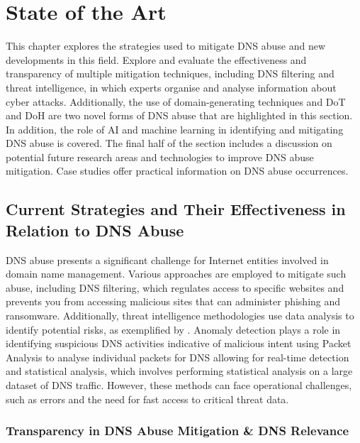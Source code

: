 \chapter{State of the Art}

This chapter explores the strategies used to mitigate DNS abuse and new developments in this field. Explore and evaluate the effectiveness and transparency of multiple mitigation techniques, including DNS filtering and threat intelligence, in which experts organise and analyse information about cyber attacks. Additionally, the use of domain-generating techniques and DoT and DoH are two novel forms of DNS abuse that are highlighted in this section. In addition, the role of AI and machine learning in identifying and mitigating DNS abuse is covered. The final half of the section includes a discussion on potential future research areas and technologies to improve DNS abuse mitigation. Case studies offer practical information on DNS abuse occurrences. 


\section{Current Strategies and Their Effectiveness in Relation to DNS Abuse}


DNS abuse presents a significant challenge for Internet entities involved in domain name management. Various approaches are employed to mitigate such abuse, including DNS filtering, which regulates access to specific websites and prevents you from accessing malicious sites that can administer phishing and ransomware. Additionally, threat intelligence methodologies use data analysis to identify potential risks, as exemplified by \cite{schmid2021thirty}. Anomaly detection plays a role in identifying suspicious DNS activities indicative of malicious intent using Packet Analysis to analyse individual packets for DNS allowing for real-time detection and statistical analysis, which involves performing statistical analysis on a large dataset of DNS traffic. However, these methods can face operational challenges, such as errors and the need for fast access to critical threat data. 

\subsection{Transparency in DNS Abuse Mitigation \& DNS Relevance}

